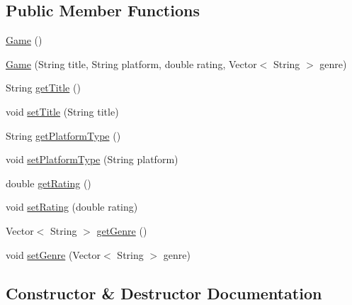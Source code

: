 \subsection*{Public Member Functions}
\begin{DoxyCompactItemize}
\item 
\hyperlink{classbridges_1_1data__src__dependent_1_1_game_a9f145dbcbbfbb0432a2cd8631e57173b}{Game} ()
\item 
\hyperlink{classbridges_1_1data__src__dependent_1_1_game_a2bb9d9f659184be2cc9fc68e38433492}{Game} (String title, String platform, double rating, Vector$<$ String $>$ genre)
\item 
String \hyperlink{classbridges_1_1data__src__dependent_1_1_game_af92a6fdd0e852e6cc5d97fb193be4ca9}{get\+Title} ()
\item 
void \hyperlink{classbridges_1_1data__src__dependent_1_1_game_a0c87151b75bc10357aa6829ebfc0cae3}{set\+Title} (String title)
\item 
String \hyperlink{classbridges_1_1data__src__dependent_1_1_game_a1eef8e419c6302ba83ea595491412494}{get\+Platform\+Type} ()
\item 
void \hyperlink{classbridges_1_1data__src__dependent_1_1_game_ab4d51e07186a9228c50210cf661304c7}{set\+Platform\+Type} (String platform)
\item 
double \hyperlink{classbridges_1_1data__src__dependent_1_1_game_a83b444e2c487701b4e9789a6a35ae210}{get\+Rating} ()
\item 
void \hyperlink{classbridges_1_1data__src__dependent_1_1_game_ab59c6ea5ee2721dcca2246e8e287154f}{set\+Rating} (double rating)
\item 
Vector$<$ String $>$ \hyperlink{classbridges_1_1data__src__dependent_1_1_game_ab3c0e46513e71b56a2970ac014b1bf79}{get\+Genre} ()
\item 
void \hyperlink{classbridges_1_1data__src__dependent_1_1_game_ab3c9d9cd9f0acdd7bdc6ea7e1b140868}{set\+Genre} (Vector$<$ String $>$ genre)
\end{DoxyCompactItemize}


\subsection{Constructor \& Destructor Documentation}
\mbox{\label{classbridges_1_1data__src__dependent_1_1_game_a9f145dbcbbfbb0432a2cd8631e57173b}} 
